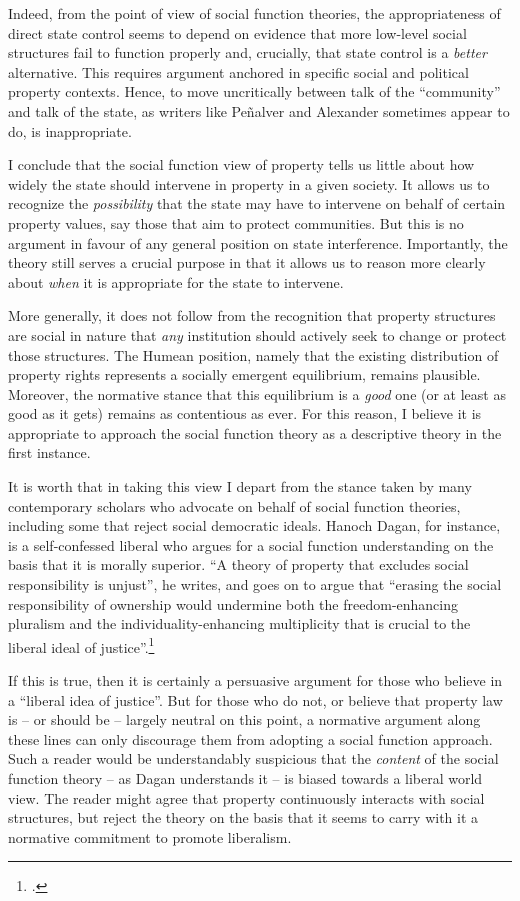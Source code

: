 Indeed, from the point of view of social function theories, the appropriateness of direct state control seems to depend on evidence that more low-level social structures fail to function properly and, crucially, that state control is a {\it better} alternative. This requires argument anchored in specific social and political property contexts. Hence, to move uncritically between talk of the ``community'' and talk of the state, as writers like Pe\~{n}alver and Alexander sometimes appear to do, is inappropriate.

I conclude that the social function view of property tells us little about how widely the state should intervene in property in a given society. It allows us to recognize the {\it possibility} that the state may have to intervene on behalf of certain property values, say those that aim to protect communities. But this is no argument in favour of any general position on state interference. Importantly, the theory still serves a crucial purpose in that it allows us to reason more clearly about {\it when} it is appropriate for the state to intervene.

More generally, it does not follow from the recognition that property structures are social in nature that {\it any} institution should actively seek to change or protect those structures. The Humean position, namely that the existing distribution of property rights represents a socially emergent equilibrium, remains plausible. Moreover, the normative stance that this equilibrium is a {\it good} one (or at least as good as it gets) remains as contentious as ever. For this reason, I believe it is appropriate to approach the social function theory as a descriptive theory in the first instance.

It is worth  that in taking this view I depart from the stance taken by many contemporary scholars who advocate on behalf of social function theories, including some that reject social democratic ideals. Hanoch Dagan, for instance, is a self-confessed liberal who argues for a social function understanding on the basis that it is morally superior. ``A theory of property that excludes social responsibility is unjust'', he writes, and goes on to argue that ``erasing the social responsibility of ownership would undermine both the freedom-enhancing pluralism and the individuality-enhancing multiplicity that is crucial to the liberal ideal of justice''.\footcite[1259]{dagan07}

If this is true, then it is certainly a persuasive argument for those who believe in a ``liberal idea of justice''. But for those who do not, or believe that property law is -- or should be -- largely neutral on this point, a normative argument along these lines can only discourage them from adopting a social function approach. Such a reader would be understandably suspicious that the {\it content} of the social function theory -- as Dagan understands it -- is biased towards a liberal world view. The reader might agree that property continuously interacts with social structures, but reject the theory on the basis that it seems to carry with it a normative commitment to promote liberalism.

